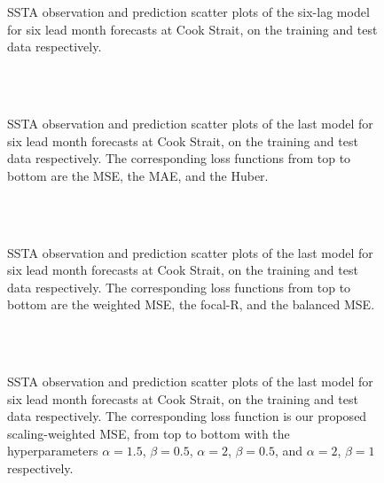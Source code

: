 \documentclass[11pt, a4paper]{article}
\begin{document}
\begin{figure}[H]
\centering
{}
\caption{SSTA observation and prediction scatter plots of the six-lag model for six lead month forecasts at Cook Strait, on the training and test data respectively.}
\end{figure}

\begin{figure}[H]
\centering
{}
\\
\\
\caption{SSTA observation and prediction scatter plots of the last model for six lead month forecasts at Cook Strait, on the training and test data respectively. The corresponding loss functions from top to bottom are the MSE, the MAE, and the Huber.}
\end{figure}

\begin{figure}[H]
\centering
{}
\\
\\
\caption{SSTA observation and prediction scatter plots of the last model for six lead month forecasts at Cook Strait, on the training and test data respectively. The corresponding loss functions from top to bottom are the weighted MSE, the focal-R, and the balanced MSE.}
\end{figure}

\begin{figure}[H]
\centering
{}
\\
\\
\caption{SSTA observation and prediction scatter plots of the last model for six lead month forecasts at Cook Strait, on the training and test data respectively. The corresponding loss function is our proposed scaling-weighted MSE, from top to bottom with the hyperparameters $\alpha=1.5$, $\beta=0.5$, $\alpha=2$, $\beta=0.5$, and $\alpha=2$, $\beta=1$ respectively.}
\end{figure}
\end{document}
